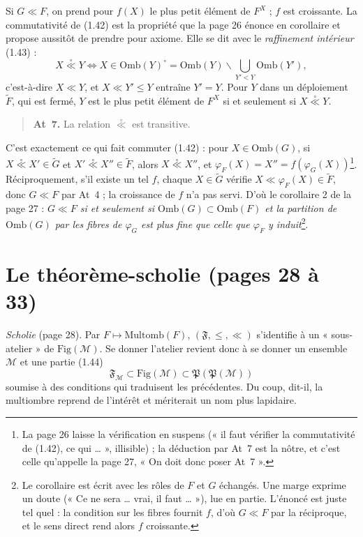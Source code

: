 \documentclass[11pt,a4paper]{article}
\begin{document}
Si $G \ll F$, on prend pour $f(X)$ le plus petit élément de $F^{X}$ ; $f$ est
croissante. La commutativité de (1.42) est la propriété que la page 26 énonce en
corollaire et propose aussitôt de prendre pour axiome. Elle se dit avec le
\emph{raffinement intérieur} (1.43) :
\[
X \mathrel{\overset{\circ}{\ll}} Y \iff X \in \mathrm{Omb}(Y)^{\circ} =
\mathrm{Omb}(Y) \smallsetminus \bigcup_{Y' < Y} \mathrm{Omb}(Y') ,
\]
c'est-à-dire $X \ll Y$, et $X \ll Y' \leq Y$ entraîne $Y' = Y$. Pour $Y$ dans un
déploiement $\widetilde{F}$, qui est fermé, $Y$ est le plus petit élément de
$F^{X}$ si et seulement si $X \mathrel{\overset{\circ}{\ll}} Y$.

\begin{quote}
\textbf{At~7.} La relation $\overset{\circ}{\ll}$ est transitive.
\end{quote}

C'est exactement ce qui fait commuter (1.42) : pour $X \in \mathrm{Omb}(G)$, si
$X \mathrel{\overset{\circ}{\ll}} X' \in \widetilde{G}$ et $X'
\mathrel{\overset{\circ}{\ll}} X'' \in \widetilde{F}$, alors $X
\mathrel{\overset{\circ}{\ll}} X''$, et $\varphi_{F}(X) = X'' =
f(\varphi_{G}(X))$\footnote{La page 26 laisse la vérification en suspens (« il
faut vérifier la commutativité de (1.42), ce qui … », illisible) ; la
déduction par At~7 est la nôtre, et c'est celle qu'appelle la page 27, « On
doit donc poser At~7 ».}. Réciproquement, s'il existe un tel $f$, chaque $X \in
\widetilde{G}$ vérifie $X \ll \varphi_{F}(X) \in \widetilde{F}$, donc $G \ll F$
par At~4 ; la croissance de $f$ n'a pas servi. D'où le corollaire 2 de la page
27 : \emph{$G \ll F$ si et seulement si $\mathrm{Omb}(G) \subset \mathrm{Omb}(F)$
et la partition de $\mathrm{Omb}(G)$ par les fibres de $\varphi_{G}$ est plus
fine que celle que $\varphi_{F}$ y induit}\footnote{Le corollaire est écrit avec
les rôles de $F$ et $G$ échangés. Une marge exprime un doute (« Ce ne sera
… vrai, il faut … »), lue en partie. L'énoncé est juste tel quel : la
condition sur les fibres fournit $f$, d'où $G \ll F$ par la réciproque, et le
sens direct rend alors $f$ croissante.}.

\section*{Le théorème-scholie (pages 28 à 33)}

\emph{Scholie} (page 28). Par $F \mapsto \mathrm{Multomb}(F)$, $(\mathfrak{F},
\leq, \ll)$ s'identifie à un « sous-atelier » de $\mathrm{Fig}(\mathcal{M})$.
Se donner l'atelier revient donc à se donner un ensemble $\mathcal{M}$ et une
partie (1.44)
\[
\mathfrak{F}_{\mathcal{M}} \subset \mathrm{Fig}(\mathcal{M}) \subset
\mathfrak{P}(\mathfrak{P}(\mathcal{M}))
\]
soumise à des conditions qui traduisent les précédentes. Du coup, dit-il, la
multiombre reprend de l'intérêt et mériterait un nom plus lapidaire.
\end{document}
